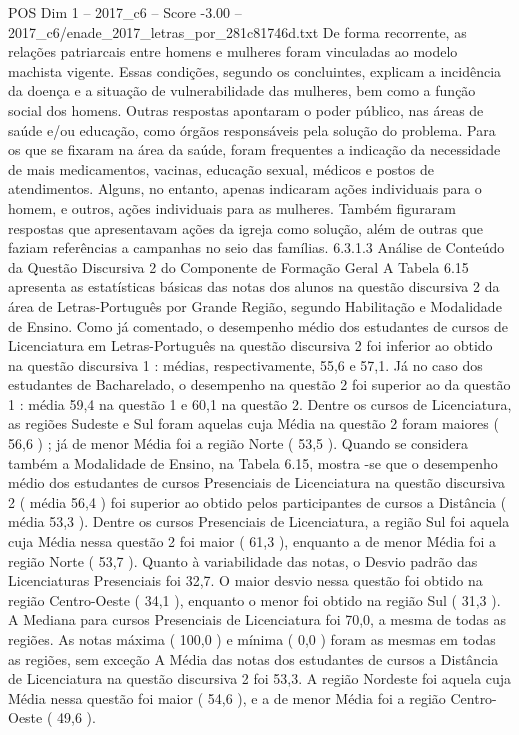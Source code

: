 \begin{textsample}{POS Dim 1 – 2017\_c6 – Score -3.00 – 2017\_c6/enade\_2017\_letras\_por\_281c81746d.txt}
De forma recorrente, as relações patriarcais entre homens e mulheres foram vinculadas ao modelo machista vigente.
Essas condições, segundo os concluintes, explicam a incidência da doença e a situação de vulnerabilidade das mulheres, bem como a função social dos homens.
Outras respostas apontaram o poder público, nas áreas de saúde e/ou educação, como órgãos responsáveis pela solução do problema.
Para os que se fixaram na área da saúde, foram frequentes a indicação da necessidade de mais medicamentos, vacinas, educação sexual, médicos e postos de atendimentos.
Alguns, no entanto, apenas indicaram ações individuais para o homem, e outros, ações individuais para as mulheres.
Também figuraram respostas que apresentavam ações da igreja como solução, além de outras que faziam referências a campanhas no seio das famílias. 6.3.1.3 Análise de Conteúdo da Questão Discursiva 2 do Componente de Formação Geral A Tabela 6.15 apresenta as estatísticas básicas das notas dos alunos na questão discursiva 2 da área de Letras-Português por Grande Região, segundo Habilitação e Modalidade de Ensino.
Como já comentado, o desempenho médio dos estudantes de cursos de Licenciatura em Letras-Português na questão discursiva 2 foi inferior ao obtido na questão discursiva 1 : médias, respectivamente, 55,6 e 57,1.
Já no caso dos estudantes de Bacharelado, o desempenho na questão 2 foi superior ao da questão 1 : média 59,4 na questão 1 e 60,1 na questão 2.
Dentre os cursos de Licenciatura, as regiões Sudeste e Sul foram aquelas cuja Média na questão 2 foram maiores ( 56,6 ) ; já de menor Média foi a região Norte ( 53,5 ).
Quando se considera também a Modalidade de Ensino, na Tabela 6.15, mostra -se que o desempenho médio dos estudantes de cursos Presenciais de Licenciatura na questão discursiva 2 ( média 56,4 ) foi superior ao obtido pelos participantes de cursos a Distância ( média 53,3 ).
Dentre os cursos Presenciais de Licenciatura, a região Sul foi aquela cuja Média nessa questão 2 foi maior ( 61,3 ), enquanto a de menor Média foi a região Norte ( 53,7 ).
Quanto à variabilidade das notas, o Desvio padrão das Licenciaturas Presenciais foi 32,7.
O maior desvio nessa questão foi obtido na região Centro-Oeste ( 34,1 ), enquanto o menor foi obtido na região Sul ( 31,3 ).
A Mediana para cursos Presenciais de Licenciatura foi 70,0, a mesma de todas as regiões.
As notas máxima ( 100,0 ) e mínima ( 0,0 ) foram as mesmas em todas as regiões, sem exceção A Média das notas dos estudantes de cursos a Distância de Licenciatura na questão discursiva 2 foi 53,3.
A região Nordeste foi aquela cuja Média nessa questão foi maior ( 54,6 ), e a de menor Média foi a região Centro-Oeste ( 49,6 ).

\end{textsample}
